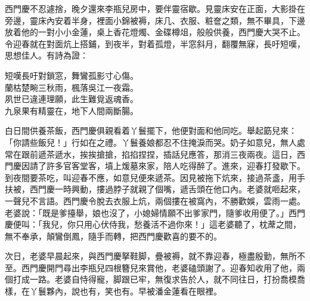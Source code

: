 西門慶不忍遽捨，晚夕還來李瓶兒房中，要伴靈宿歇。見靈床安在正面，大影掛在旁邊，靈床內安着半身，裡面小錦被褥，床几、衣服、粧奩之類，無不畢具，下邊放着他的一對小小金蓮，{}桌上香花燈燭、金碟樽俎，般般供養，西門慶大哭不止。令迎春就在對面炕上搭鋪，到夜半，對着孤燈，半窓斜月，翻覆無寐，長吁短嘆，思想佳人。有詩為證：

\begin{myquote} 
短嘆長吁對鎖窓，舞鸞孤影寸心傷。\\蘭枯楚畹三秋雨，楓落吳江一夜霜。\\夙世已違連理願，此生難覓返魂香。\\九泉果有精靈在，地下人間兩斷腸。
\end{myquote} 

白日間供養茶飯，西門慶俱親看着丫鬟擺下，他便對面和他同吃。舉起筯兒來：「你請些飯兒！」{}行如在之禮。丫鬟養娘都忍不住掩淚而哭。奶子如意兒，無人處常在跟前遞茶遞水，挨挨搶搶，掐掐捏捏，插話兒應答，那消三夜兩夜。{}這日，西門慶因請了許多官客堂客，墳上煖墓來家，陪人吃得醉了。進來，迎春打發歇下。到夜間要茶吃，叫迎春不應，如意兒便來遞茶。因見被拖下炕來，接過茶盞，用手扶被，西門慶一時興動，摟過脖子就親了個嘴，遞舌頭在他口內。老婆就咂起來，一聲兒不言語。西門慶令脫去衣服上炕，兩個摟在被窩內，不勝歡娛，雲雨一處。老婆說：「既是爹擡舉，娘也沒了，小媳婦情願不出爹家門，隨爹收用便了。」西門慶便叫：「我兒，你只用心伏侍我，愁養活不過你來！」這老婆聽了，枕蓆之間，無不奉承，顛鸞倒鳳，隨手而轉，{}把西門慶歡喜的要不的。

次日，老婆早晨起來，與西門慶拏鞋脚，疊被褥，就不靠迎春，極盡殷勤，無所不至。西門慶開門尋出李瓶兒四根簪兒來賞他，老婆磕頭謝了。迎春知收用了他，兩個打成一路。老婆自恃得寵，脚跟已牢，無復求告於人，就不同往日，打扮喬模喬樣，在丫鬟夥內，說也有，笑也有。{}早被潘金蓮看在眼裡。

